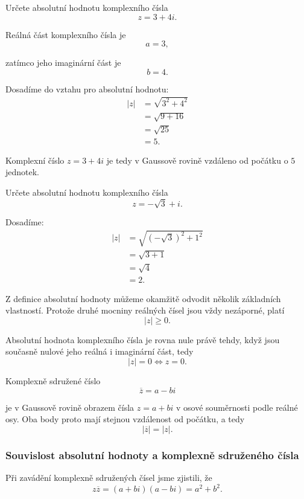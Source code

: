 \documentclass[12pt,a4paper]{article}
\begin{document}
\begin{examplebox}
    Určete absolutní hodnotu komplexního čísla
    \[
        z=3+4i.
    \]

    Reálná část komplexního čísla je
    \[
        a=3,
    \]

    zatímco jeho imaginární část je
    \[
        b=4.
    \]

    Dosadíme do vztahu pro absolutní hodnotu:
    \begin{align*}
        |z| &= \sqrt{3^2+4^2} \\
            &= \sqrt{9+16} \\
            &= \sqrt{25} \\
            &= 5.
    \end{align*}

    Komplexní číslo $z=3+4i$ je tedy v Gaussově rovině vzdáleno od počátku o $5$ jednotek.
\end{examplebox}

\begin{examplebox}
    Určete absolutní hodnotu komplexního čísla
    \[
        z=-\sqrt{3}+i.
    \]

    Dosadíme:
    \begin{align*}
        |z| &= \sqrt{(-\sqrt{3})^2+1^2} \\
            &= \sqrt{3+1} \\
            &= \sqrt{4} \\
            &= 2.
    \end{align*}

\end{examplebox}

Z definice absolutní hodnoty můžeme okamžitě odvodit několik základních vlastností. 
Protože druhé mocniny reálných čísel jsou vždy nezáporné, platí
\[
    |z|\geq0.
\]

Absolutní hodnota komplexního čísla je rovna nule právě tehdy, 
když jsou současně nulové jeho reálná i imaginární část, tedy
\[
    |z|=0 \Longleftrightarrow z=0.
\]

Komplexně sdružené číslo
\[
    \overline{z}=a-bi
\]

je v Gaussově rovině obrazem čísla $z=a+bi$ v osové souměrnosti podle reálné osy.
Oba body proto mají stejnou vzdálenost od počátku, a tedy
\[
    |\overline{z}|=|z|.
\]



\subsubsection*{Souvislost absolutní hodnoty a komplexně sdruženého čísla}
Při zavádění komplexně sdružených čísel jsme zjistili, že
\[
    z\overline{z} = (a+bi)(a-bi) = a^2+b^2.
\]
\end{document}
